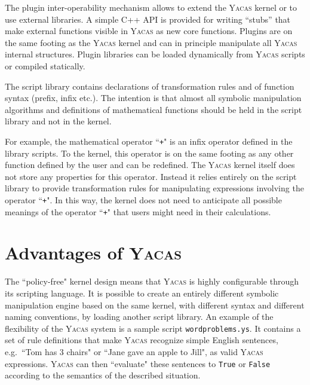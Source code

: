 \documentclass{llncs}
\begin{document}
The plugin inter-operability mechanism allows to extend the \textsc{Yacas} kernel or to use external libraries. A simple C++ API is provided for writing ``stubs'' that make external functions visible in \textsc{Yacas} as new core functions. Plugins are on the same footing as the \textsc{Yacas} kernel and can in principle manipulate all \textsc{Yacas} internal structures. Plugin libraries can be loaded dynamically from \textsc{Yacas} scripts or compiled statically.

%
The script library contains declarations of transformation rules and of function
syntax (prefix, infix etc.). The intention is that almost all symbolic manipulation algorithms and definitions
of mathematical functions should be held in the script library and not in the kernel. 


For example, the mathematical operator ``\texttt{+}" is an infix operator defined in the
library scripts. To the kernel, this operator is on the same footing as any
other function defined by the user and can be redefined. The \textsc{Yacas} kernel
itself does not store any properties for this operator. Instead it relies
entirely on the script library to provide transformation rules for manipulating
expressions involving the operator ``\texttt{+}". In this way, the kernel does not need
to anticipate all possible meanings of the operator ``\texttt{+}" that users might need
in their calculations.

\section{Advantages of \textsc{Yacas}}

The ``policy-free" kernel design means that \textsc{Yacas} is highly configurable
through its scripting language. It is possible to create an entirely different
symbolic manipulation engine based on the same kernel, with different syntax
and different naming  conventions, by loading another script library. An example of the flexibility of the
\textsc{Yacas} system is a sample script \texttt{wordproblems.ys}. It contains
a set of rule definitions that make \textsc{Yacas} recognize simple English
sentences, e.g.~``Tom has 3 chairs" or ``Jane gave an apple to Jill", as
valid \textsc{Yacas} expressions. \textsc{Yacas} can then ``evaluate" these
sentences to \texttt{True} or \texttt{False} according to the semantics of the
described situation.
\end{document}
